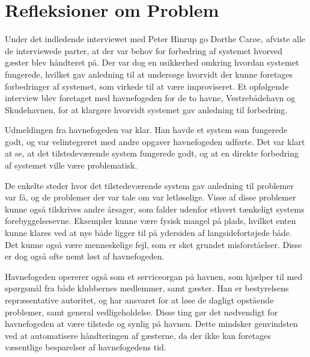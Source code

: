 \chapter{Refleksioner om Problem}

Under det indledende interviewet med Peter Hinrup go Dorthe Carøe, afviste alle de interviewede parter, at der var behov for forbedring af systemet hvorved gæster blev håndteret på. Der var dog en usikkerhed omkring hvordan systemet fungerede, hvilket gav anledning til at undersøge hvorvidt der kunne foretages forbedringer af systemet, som virkede til at være improviseret. Et opfølgende interview blev foretaget med havnefogeden for de to havne, Vestrebådehavn og Skudehavnen, for at klargøre hvorvidt systemet gav anledning til forbedring.

Udmeldingen fra havnefogeden var klar. Han havde et system som fungerede godt, og var velintegreret med andre opgaver havnefogeden udførte. Det var klart at se, at det tilstedeværende system fungerede godt, og at en direkte forbedring af systemet ville være problematisk. 


De enkelte steder hvor det tilstedeværende system gav anledning til problemer var få, og de problemer der var tale om var letløselige. Visse af disse problemer kunne også tilskrives andre årsager, som falder udenfor ethvert tænkeligt systems forebyggelsesevne. Eksempler kunne være fysisk mangel på plads, hvilket enten kunne klares ved at nye både ligger til på ydersiden af langsidefortøjede både. Det kunne også være menneskelige fejl, som er sket grundet misforståelser. Disse er dog også ofte nemt løst af havnefogeden.

Havnefogeden opererer også som et serviceorgan på havnen, som hjælper til med spørgsmål fra både klubbernes medlemmer, samt gæster. Han er bestyrelsens repræsentative autoritet, og har ansvaret for at løse de dagligt opstående problemer, samt general vedligeholdelse. Disse ting gør det nødvendigt for havnefogeden at være tilstede og synlig på havnen. Dette mindsker genvindsten ved at automatisere håndteringen af gæsterne, da der ikke kan foretages væsentlige besparelser af havnefogedens tid.